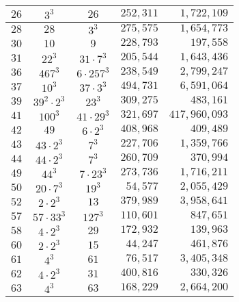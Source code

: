 \documentclass{jT}
\theoremstyle{definition}
\begin{document}
\begin{table}[ht]
\begin{center}
\begin{tabular}{||cccrr||}
$26$  & $3^{3}$             &          $26$           & $252,311$ &   $1,722,109$  \\ \hline
$28$  & $28$                 &         $3^{3}$         & $275,575$ &   $1,654,773$ \\ \hline
$30$  & $10$                 &          $9$            & $228,793$ &     $197,558$  \\ \hline
$31$  & $22^{3}$             &    $31 \cdot 7^{3}$     & $205,544$ &   $1,643,436$  \\ \hline
$36$  & $467^{3}$            &   $6 \cdot 257^{3}$     & $238,549$ &   $2,799,247$  \\ \hline
$37$  & $10^{3}$             &    $37 \cdot 3^{3}$     & $494,731$ &   $6,591,064$  \\ \hline
$39$  & $39^{2} \cdot 2^{3}$ &        $23^{3}$         & $309,275$ &     $483,161$  \\ \hline
$41$  & $100^{3}$            &    $41 \cdot 29^{3}$    & $321,697$ & $417,960,093$ \\ \hline
$42$  & $49$                 &     $6 \cdot 2^{3}$     & $408,968$ &    $409,489$ \\ \hline
$43$  & $43 \cdot 2^{3}$     &         $7^{3}$         & $227,706$ &  $1,359,766$ \\ \hline
$44$  & $44 \cdot 2^{3}$     &         $7^{3}$         & $260,709$ &    $370,994$ \\ \hline
$49$  & $44^{3}$             &    $7 \cdot 23^{3}$     & $273,736$ &  $1,716,211$ \\ \hline
$50$  & $20 \cdot 7^{3}$     &         $19^{3}$        &  $54,577$ &  $2,055,429$ \\ \hline
$52$  & $2 \cdot 2^{3}$      &          $13$           & $379,989$ &  $3,958,641$ \\ \hline
$57$  & $57 \cdot 33^{3}$    &        $127^{3}$        & $110,601$ &    $847,651$ \\ \hline
$58$  & $4 \cdot 2^{3}$      &         $29$            & $172,932$ &    $139,963$ \\ \hline
$60$  & $2 \cdot 2^{3}$      &         $15$            &  $44,247$ &    $461,876$ \\ \hline
$61$  & $4^{3}$              &         $61$            &  $76,517$ &  $3,405,348$ \\ \hline
$62$  & $4 \cdot 2^{3}$      &         $31$            & $400,816$ &    $330,326$ \\ \hline
$63$  & $4^{3}$              &         $63$            & $168,229$ &  $2,664,200$ \\ \hline

\end{tabular}
\end{center}
\end{table}
\end{document}
